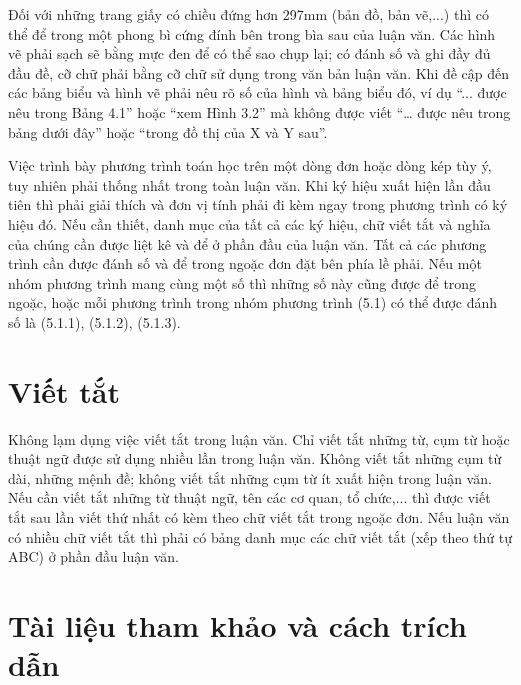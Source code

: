 Đối với những trang giấy có chiều đứng hơn 297mm (bản đồ, bản vẽ,...) thì có thể để trong một phong bì cứng đính bên trong bìa sau của luận văn.
Các hình vẽ phải sạch sẽ bằng mực đen để có thể sao chụp lại; có đánh số và ghi đầy đủ đầu đề, cỡ chữ phải bằng cỡ chữ sử dụng trong văn bản luận văn.
Khi đề cập đến các bảng biểu và hình vẽ phải nêu rõ số của hình và bảng biểu đó, ví dụ ``... được nêu trong Bảng 4.1'' hoặc ``xem Hình 3.2'' mà không được viết ``… được nêu trong bảng dưới đây'' hoặc ``trong đồ thị của X và Y sau''.

Việc trình bày phương trình toán học trên một dòng đơn hoặc dòng kép tùy ý, tuy nhiên phải thống nhất trong toàn luận văn.
Khi ký hiệu xuất hiện lần đầu tiên thì phải giải thích và đơn vị tính phải đi kèm ngay trong phương trình có ký hiệu đó.
Nếu cần thiết, danh mục của tất cả các ký hiệu, chữ viết tắt và nghĩa của chúng cần được liệt kê và để ở phần đầu của luận văn.
Tất cả các phương trình cần được đánh số và để trong ngoặc đơn đặt bên phía lề phải.
Nếu một nhóm phương trình mang cùng một số thì những số này cũng được để trong ngoặc, hoặc mỗi phương trình trong nhóm phương trình (5.1) có thể được đánh số là (5.1.1), (5.1.2), (5.1.3).

\section{Viết tắt}

Không lạm dụng việc viết tắt trong luận văn.
Chỉ viết tắt những từ, cụm từ hoặc thuật ngữ được sử dụng nhiều lần trong luận văn.
Không viết tắt những cụm từ  dài, những mệnh đề; không viết tắt những cụm từ ít xuất hiện trong luận văn.
Nếu cần viết tắt những từ thuật ngữ, tên các cơ quan, tổ chức,... thì được viết tắt sau lần viết thứ nhất có kèm theo chữ viết tắt trong ngoặc đơn.
Nếu luận văn có nhiều chữ viết tắt thì phải có bảng danh mục các chữ viết tắt (xếp theo thứ tự ABC) ở phần đầu luận văn.

\section{Tài liệu tham khảo và cách trích dẫn}

